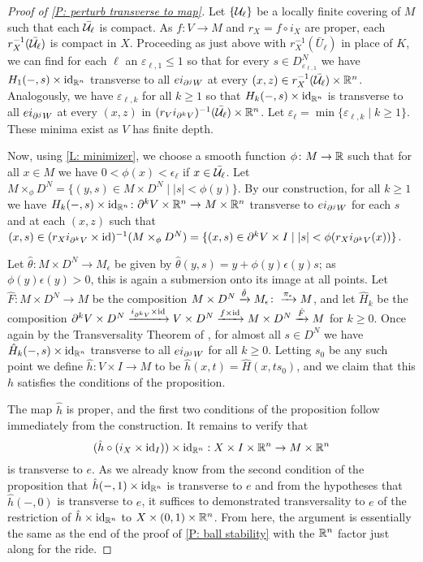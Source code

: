 \begin{proof}[Proof of \cref{P: perturb transverse to map}]
 Let $\{\mathcal{U}_\ell\}$ be a locally finite covering of $M$ such that each $\bar{\mathcal{U}_\ell}$ is compact. As $f \colon V \to M$ and $r_X = f \circ i_{X}$ are proper, each $r^{-1}_X(\bar {\mathcal{U}_\ell})$ is compact in $X$. Proceeding as just above with $r_X^{-1}(\bar U_\ell)$ in place of $K$, we can find for each $\ell$ an $\varepsilon_{\ell,1}\leq 1$ so that for every $s \in D^N_{\varepsilon_{\ell,1}}$ we have $H_1(-,s) \times \mathrm{id}_{\mathbb{R}^n}$ transverse to all $ei_{\partial^jW}$ at every $(x,z) \in r^{-1}_X(\bar {\mathcal{U}_\ell}) \times \mathbb{R}^n$. Analogously, we have $\varepsilon_{\ell,k}$ for all $k\geq 1$ so that $H_k(-,s) \times \mathrm{id}_{\mathbb{R}^n}$ is transverse to all $ei_{\partial^jW}$ at every $(x,z)$ in $(r_Vi_{\partial^kV})^{-1}(\bar {\mathcal{U}_\ell}) \times \mathbb{R}^n$. Let $\varepsilon_\ell = \min\{\varepsilon_{\ell,k}\mid k\geq 1\}$. These minima exist as $V$ has finite depth.



Now, using \cref{L: minimizer}, we choose a smooth function $\phi \colon M \to \mathbb{R}$ such that for all $x \in M$ we have $0<\phi(x)<\epsilon_\ell$ if $x \in \bar{\mathcal{U}_\ell}$. Let $M\times_\phi D^N = \{(y,s) \in M \times D^N\mid |s|<\phi(y)\}$. By our construction, for all $k\geq 1$ we have $H_k(-,s) \times \mathrm{id}_{\mathbb{R}^n} \colon \partial^{k}V \times \mathbb{R}^n \to M \times \mathbb{R}^n$ transverse to $ei_{\partial^jW}$ for each $s$ and at each $(x,z)$ such that $(x,s)\in(r_Xi_{\partial^{k}V} \times \mathrm{id})^{-1}(M\times_\phi D^N) = \{(x,s) \in \partial^{k}V \times I\mid |s|<\phi(r_Xi_{\partial^kV}(x))\}$.


Let $\hat \theta: M \times D^N \to M_\epsilon$ be given by $\hat \theta(y, s) = y +\phi(y) \epsilon(y) s$; as $\phi(y)\epsilon(y)>0$, this is again a submersion onto its image at all points. Let $\hat F \colon M \times D^N \to M$ be the composition $M \times D^N \xrightarrow{\hat \theta}M_\epsilon\colon\xrightarrow{\pi_\epsilon}M$, and let $\hat H_k$ be the composition $\partial^kV \times D^N \xrightarrow{i_{\partial^kV} \times \mathrm{id}}V \times D^N \xrightarrow{f \times \mathrm{id}} M \times D^N \xrightarrow{\hat F} M$ for $k\geq 0$. Once again by the Transversality Theorem of \cite[Section 2.3]{GuPo74}, for almost all $s \in D^N$ we have $\hat H_k(-,s) \times \mathrm{id}_{\mathbb{R}^n}$ transverse to all $ei_{\partial^jW}$
 for all $k\geq 0$. Letting $s_0$ be any such point we define $\hat h \colon V \times I \to M$ to be $\hat h(x,t) = \hat H(x,ts_0)$, and we claim that this $h$ satisfies the conditions of the proposition.

The map $\hat h$ is proper, and the first two conditions of the proposition follow immediately from the construction. It remains to verify that $$(\hat h\circ(i_{X} \times \mathrm{id}_I))\times\mathrm{id}_{\mathbb{R}^n}: X \times I \times \mathbb{R}^n \to M \times \mathbb{R}^n$$ is transverse to $e$. As we already know from the second condition of the proposition that $\hat h(-,1) \times \mathrm{id}_{\mathbb{R}^n}$ is transverse to $e$ and from the hypotheses that $\hat h(-,0)$ is transverse to $e$, it suffices to demonstrated transversality to $e$ of the restriction of $\hat h \times \mathrm{id}_{\mathbb{R}^n}$ to $X \times (0,1) \times \mathbb{R}^n$. From here, the argument is essentially the same as the end of the proof of \cref{P: ball stability} with the $\mathbb{R}^n$ factor just along for the ride.


\end{proof}
